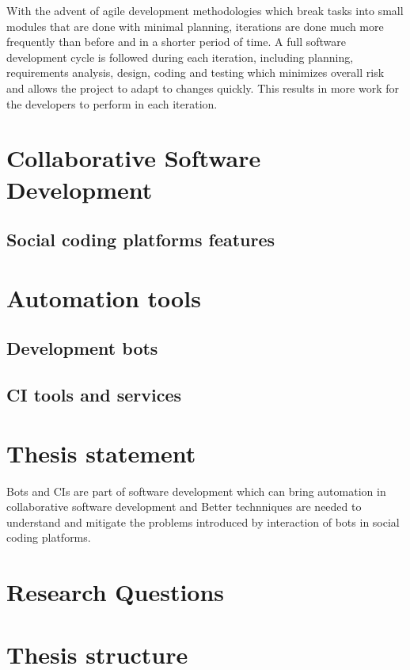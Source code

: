With the advent of agile development methodologies which break tasks into small modules that are done with minimal planning, iterations are done much more frequently than before and in a shorter period of time.
A full software development cycle is followed during each iteration, including planning, requirements analysis, design, coding and testing which minimizes overall risk and allows the project to adapt to changes quickly.
This results in more work for the developers to perform in each iteration.



\section{Collaborative Software Development}
\label{sec:csd}

\subsection{Social coding platforms features}

\section{Automation tools}


\subsection{Development bots}
\subsection{CI tools and services}


\section{Thesis statement}

\begin{center}
	\begin{tcolorbox}[sharp corners, colback=blue!10, colframe=gray!80!blue, coltitle=white,fonttitle=\sffamily\large, title=Thesis statement, width=.97\textwidth]
		Bots and CIs are part of software development which can bring automation in collaborative software development and Better technniques are needed to understand and mitigate the problems introduced by interaction of bots in social coding platforms. 
		
	\end{tcolorbox}
\end{center}

\section{Research Questions}
\label{sec:rqa}


\section{Thesis structure}
\label{sec:structure}
